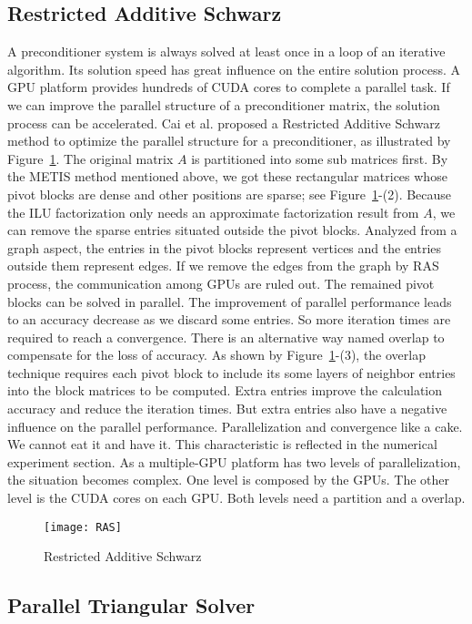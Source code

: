 \documentclass[runningheads,a4paper]{llncs}
\begin{document}
{\subsection{Restricted Additive Schwarz}
A preconditioner system is always solved at least once in a loop of an iterative algorithm. Its solution speed has great influence on the entire solution process. A GPU platform provides hundreds of CUDA cores to complete a parallel task. If we can improve the parallel structure of a preconditioner matrix, the solution process can be accelerated. Cai et al. proposed a Restricted Additive Schwarz method to optimize the parallel structure for a preconditioner, as illustrated by Figure~\ref{fig_RAS}. The original matrix $A$ is partitioned into some sub matrices first. By the METIS method mentioned above, we got these rectangular matrices whose pivot blocks are dense and other positions are sparse; see Figure~\ref{fig_RAS}-(2). Because the ILU factorization only needs an approximate factorization result from $A$, we can remove the sparse entries situated outside the pivot blocks. Analyzed from a graph aspect, the entries in the pivot blocks represent vertices and the entries outside them represent edges. If we remove the edges from the graph by RAS process, the communication among GPUs are ruled out. The remained pivot blocks can be solved in parallel. The improvement of parallel performance leads to an accuracy decrease as we discard some entries. So more iteration times are required to reach a convergence. There is an alternative way named overlap to compensate for the loss of accuracy. As shown by Figure~\ref{fig_RAS}-(3), the overlap technique requires each pivot block to include its some layers of neighbor entries into the block matrices to be computed. Extra entries improve the calculation accuracy and reduce the iteration times. But extra entries also have a negative influence on the parallel performance. Parallelization and convergence like a cake. We cannot eat it and have it. This characteristic is reflected in the numerical experiment section. As a multiple-GPU platform has two levels of parallelization, the situation becomes complex. One level is composed by the GPUs. The other level is the CUDA cores on each GPU. Both levels need a partition and a overlap.

\begin{figure}[!tbh]
    \centering
    \texttt{[image: RAS]}
    \caption{Restricted Additive Schwarz}
    \label{fig_RAS}
\end{figure}
\subsection{Parallel Triangular Solver}

}
\end{document}
